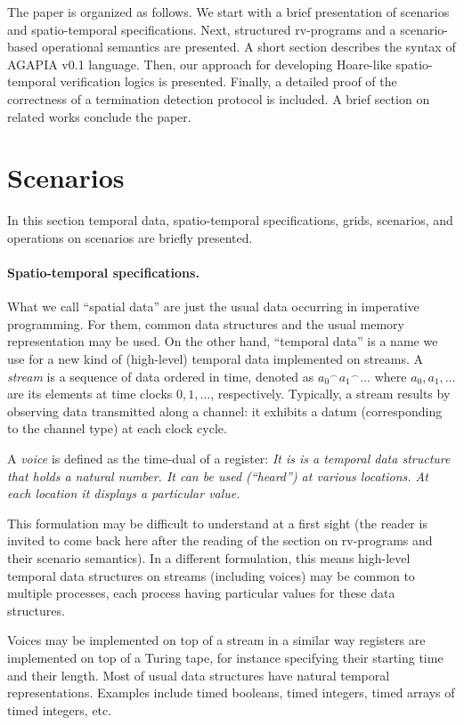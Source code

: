 \documentclass[runningheads]{llncs}
\newcommand{\1}{\u{a}}
\newcommand{\2}{\c{s}}
\newcommand{\5}{\c{t}}
\newcommand{\8}{\^{\i}}
\newcommand{\9}{\^{a}}
\begin{document}
The paper is organized as follows. We start with a brief presentation of scenarios and spatio-temporal
specifications. Next, structured rv-programs and a scenario-based operational semantics are presented. A short
section describes the syntax of AGAPIA v0.1 language. Then, our approach for developing Hoare-like
spatio-temporal verification logics is presented. Finally, a detailed proof of the correctness of a
termination detection protocol is included. A brief section on related works conclude the paper.


\section{Scenarios}\label{s-scen}

In this section temporal data, spatio-temporal specifications, grids, scenarios, and operations on scenarios
are briefly presented.

\paragraph{Spatio-temporal specifications.}

What we call ``spatial data'' are just the usual data occurring in imperative programming. For them, common
data structures and the usual memory representation may be used. On the other hand, ``temporal data'' is a
name we use for a new kind of (high-level) temporal data implemented on streams. A {\em stream} \cite{br-st01}
is a sequence of data ordered in time, denoted as $a_0{}^{\frown}a_1{}^{\frown}\dots$ where $a_0,a_1,\dots$
are its elements at time clocks $0,1,\dots$, respectively.  Typically, a stream results by observing data
transmitted along a channel: it exhibits a datum (corresponding to the channel type) at each clock cycle.

A {\em voice} is defined as the time-dual of a register: {\em It is is a temporal data structure that holds a
  natural number. It can be used (``heard'') at various locations. At each location it displays a particular
  value.}

This formulation may be difficult to understand at a first sight (the reader is invited to come back here
after the reading of the section on rv-programs and their scenario semantics). In a different formulation,
this means high-level temporal data structures on streams (including voices) may be common to multiple
processes, each process having particular values for these data structures.

Voices may be implemented on top of a stream in a similar way registers are implemented on top of a Turing
tape, for instance specifying their starting time and their length. Most of usual data structures have natural
temporal representations. Examples include timed booleans, timed integers, timed arrays of timed integers,
etc.
\end{document}
